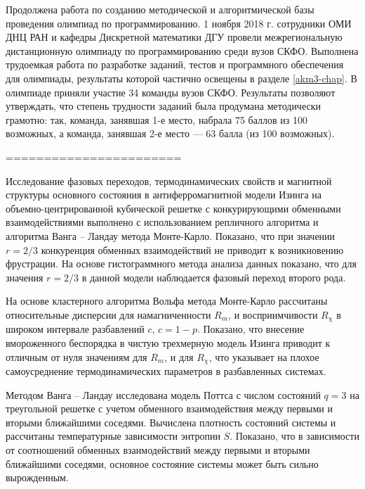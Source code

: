 Продолжена работа по созданию методической и алгоритмической базы проведения олимпиад по программированию.
1 ноября 2018 г. сотрудники ОМИ ДНЦ РАН и кафедры Дискретной математики ДГУ провели  межрегиональную дистанционную олимпиаду по программированию среди вузов СКФО.
Выполнена трудоемкая работа по разработке заданий, тестов и программного обеспечения для олимпиады, результаты которой частично освещены в разделе \ref{akm3-chap}.
%
В олимпиаде приняли участие 34 команды вузов СКФО. Результаты позволяют утверждать, что степень трудности заданий была продумана методически грамотно: так, команда, занявшая 1-е место, набрала 75 баллов из 100 возможных, а команда, занявшая 2-е место --- 63 балла (из 100 возможных).





=======================



Исследование фазовых переходов, термодинамических свойств и магнитной структуры основного состояния в антиферромагнитной модели Изинга на объемно-центрированной кубической решетке с конкурирующими обменными взаимодействиями выполнено с использованием репличного алгоритма и алгоритма Ванга -- Ландау метода Монте-Карло. Показано, что при значении $r=2/3$ конкуренция обменных взаимодействий не приводит к возникновению фрустрации. На основе гистограммного метода анализа данных показано, что для значения $r=2/3$ в данной модели наблюдается фазовый переход второго рода.





На основе кластерного алгоритма Вольфа метода Монте-Карло рассчитаны относительные дисперсии для намагниченности $R_m$, и восприимчивости $R_\chi$ в широком интервале разбавлений $c$, $c=1-p$.
Показано, что внесение вмороженного беспорядка в чистую трехмерную модель Изинга приводит к отличным от нуля значениям для $R_m$, и для $R_\chi$, что указывает на плохое самоусреднение термодинамических параметров в разбавленных системах.


Методом Ванга -- Ландау исследована модель Поттса с числом состояний $q=3$ на треугольной решетке с учетом обменного взаимодействия между первыми и вторыми ближайшими соседями. Вычислена плотность состояний системы и рассчитаны температурные зависимости энтропии $S$. Показано, что в зависимости от соотношений обменных взаимодействий между первыми и вторыми ближайшими соседями, основное состояние системы может быть сильно вырожденным.


